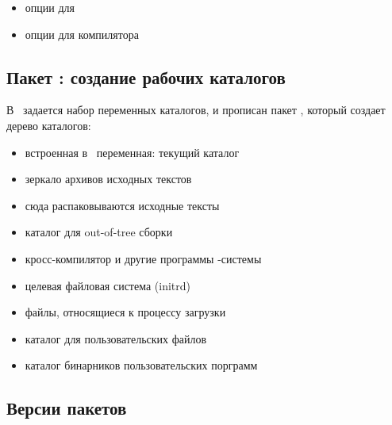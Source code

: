 {\begin{itemize}
  \item{} опции для 
  \item{} опции для компилятора 
\end{itemize}


\subsection{Пакет : создание рабочих каталогов}



В \ задается набор переменных каталогов, и прописан пакет
, который создает дерево каталогов:

\begin{itemize}
  \item{} встроенная в \make\ переменная: текущий каталог
  \item{} зеркало архивов исходных текстов
  \item{} сюда распаковываются исходные тексты
  \item{} каталог для out-of-tree сборки
  \item{} кросс-компилятор и другие программы -системы
  \item{} целевая файловая система  (initrd)
  \item{} файлы, относящиеся к процессу загрузки
  \item{} каталог для пользовательских файлов
  \item{} каталог бинарников пользовательских порграмм
\end{itemize}


\subsection{Версии пакетов}

}
